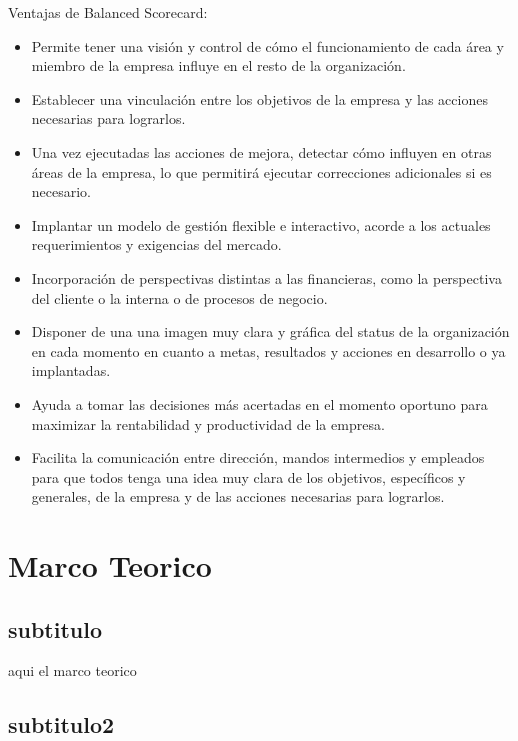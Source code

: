 \documentclass[preprint,12pt]{elsarticle}
\begin{document}
Ventajas de Balanced Scorecard:
\begin{itemize}
		\item Permite tener una visión y control de cómo el funcionamiento de cada área y miembro de la empresa influye en el resto de la organización.
		\item Establecer una vinculación entre los objetivos de la empresa y las acciones necesarias para lograrlos.
		\item Una vez ejecutadas las acciones de mejora, detectar cómo influyen en otras áreas de la empresa, lo que permitirá ejecutar correcciones adicionales si es necesario.
		\item Implantar un modelo de gestión flexible e interactivo, acorde a los actuales requerimientos y exigencias del mercado.
		\item Incorporación de perspectivas distintas a las financieras, como la perspectiva del cliente o la interna o de procesos de negocio.
		\item Disponer de una una imagen muy clara y gráfica del status de la organización en cada momento en cuanto a metas, resultados y acciones en desarrollo o ya implantadas.
		\item Ayuda a tomar las decisiones más acertadas en el momento oportuno para maximizar la rentabilidad y productividad de la empresa.
		\item Facilita la comunicación entre dirección, mandos intermedios y empleados para que todos tenga una idea muy clara de los objetivos, específicos y generales, de la empresa y de las acciones necesarias para lograrlos.
	\end{itemize}


	
	

\section{Marco Teorico}
	
\subsection{subtitulo}	

	aqui el marco teorico 
		
\subsection{subtitulo2}
		
\end{document}
